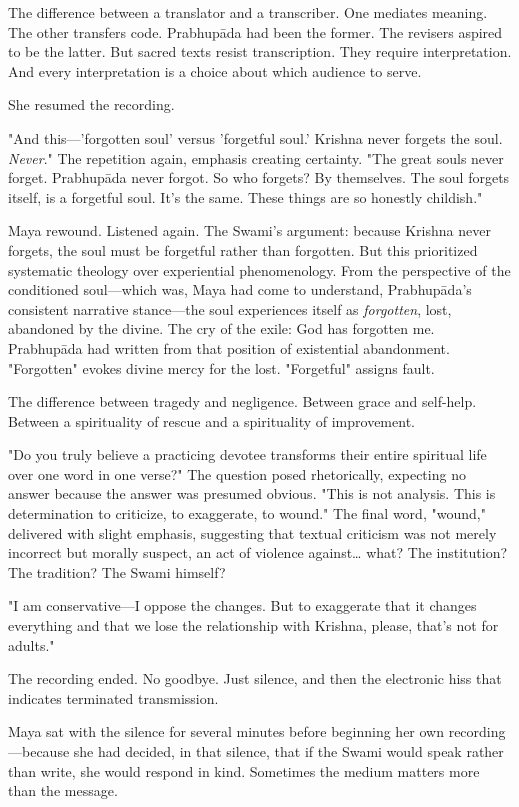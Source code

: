 \documentclass[12pt,twoside]{book}
\begin{document}
The difference between a translator and a transcriber. One mediates meaning. The other transfers code. Prabhupāda had been the former. The revisers aspired to be the latter. But sacred texts resist transcription. They require interpretation. And every interpretation is a choice about which audience to serve.

She resumed the recording.

"And this—'forgotten soul' versus 'forgetful soul.' Krishna never forgets the soul. \emph{Never}." The repetition again, emphasis creating certainty. "The great souls never forget. Prabhupāda never forgot. So who forgets? By themselves. The soul forgets itself, is a forgetful soul. It's the same. These things are so honestly childish."

Maya rewound. Listened again. The Swami's argument: because Krishna never forgets, the soul must be forgetful rather than forgotten. But this prioritized systematic theology over experiential phenomenology. From the perspective of the conditioned soul—which was, Maya had come to understand, Prabhupāda's consistent narrative stance—the soul experiences itself as \emph{forgotten}, lost, abandoned by the divine. The cry of the exile: God has forgotten me. Prabhupāda had written from that position of existential abandonment. "Forgotten" evokes divine mercy for the lost. "Forgetful" assigns fault.

The difference between tragedy and negligence. Between grace and self-help. Between a spirituality of rescue and a spirituality of improvement.

"Do you truly believe a practicing devotee transforms their entire spiritual life over one word in one verse?" The question posed rhetorically, expecting no answer because the answer was presumed obvious. "This is not analysis. This is determination to criticize, to exaggerate, to wound." The final word, "wound," delivered with slight emphasis, suggesting that textual criticism was not merely incorrect but morally suspect, an act of violence against\ldots{} what? The institution? The tradition? The Swami himself?

"I am conservative—I oppose the changes. But to exaggerate that it changes everything and that we lose the relationship with Krishna, please, that's not for adults."

The recording ended. No goodbye. Just silence, and then the electronic hiss that indicates terminated transmission.

Maya sat with the silence for several minutes before beginning her own recording—because she had decided, in that silence, that if the Swami would speak rather than write, she would respond in kind. Sometimes the medium matters more than the message.
\end{document}
